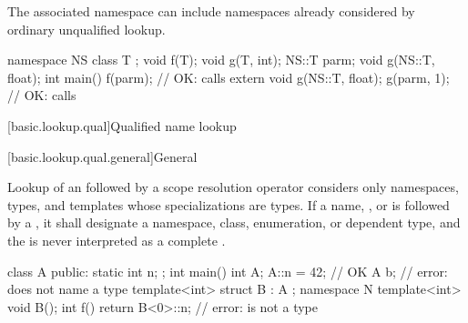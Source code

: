 \pnum
\begin{note}
The associated namespace can include namespaces
already considered by ordinary unqualified lookup.
\end{note}
\begin{example}
\begin{codeblock}
namespace NS {
  class T { };
  void f(T);
  void g(T, int);
}
NS::T parm;
void g(NS::T, float);
int main() {
  f(parm);                      // OK: calls 
  extern void g(NS::T, float);
  g(parm, 1);                   // OK: calls 
}
\end{codeblock}
\end{example}

[basic.lookup.qual]{Qualified name lookup}

[basic.lookup.qual.general]{General}

\pnum
{}%
%
%
Lookup of an 
followed by a \tcode{::} scope resolution operator
considers only
namespaces, types, and templates whose specializations are types.
If a name, , or 
is followed by a \tcode{::},
it shall designate a namespace, class, enumeration, or dependent type,
and the \tcode{::} is never interpreted as
a complete .
\begin{example}
\begin{codeblock}
class A {
public:
  static int n;
};
int main() {
  int A;
  A::n = 42;            // OK
  A b;                  // error:  does not name a type
}
template<int> struct B : A {};
namespace N {
  template<int> void B();
  int f() {
    return B<0>::n;     // error:  is not a type
  }
}
\end{codeblock}
\end{example}

%
%

